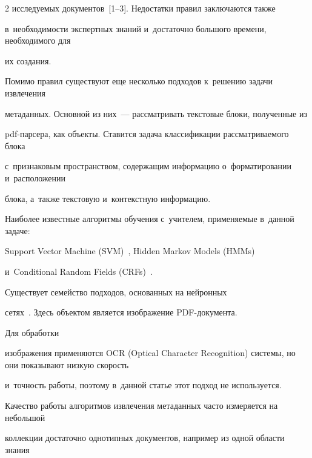 \begin{multicols}{2}
ис\-сле\-ду\-емых документов~[1--3]. Недостатки правил за\-клю\-ча\-ют\-ся также 


в~не\-об\-хо\-ди\-мости экспертных знаний и~до\-ста\-точ\-но большого времени, необходимого для 


их создания.





Помимо правил существуют еще несколько подходов к~решению задачи извлечения 


метаданных. Основной из них~--- рас\-смат\-ри\-вать текстовые блоки, полученные из 


pdf-пар\-се\-ра, как объекты. Ставится задача классификации рас\-смат\-ри\-ва\-емо\-го блока 


с~признаковым про\-стран\-ст\-вом, содержащим информацию о~форматировании и~расположении 


блока, а~так\-же текс\-то\-вую и~кон\-текст\-ную информацию.


{





}





Наиболее известные алгоритмы обуче\-ния с~учителем, при\-ме\-ня\-емые в~данной задаче: 


Support Vector Machine (SVM)~\cite{Han, Kovacevic}, Hidden Markov Models (HMMs)~\cite{Seymore} 


и~Conditional Random Fields (CRFs)~\cite{Councill}.





Существует семейство подходов, основанных на нейронных 


сетях~\cite{Rangoni, Rangoni_1}. Здесь объектом является изображение PDF-до\-ку\-мен\-та. 


Для обработки 


изображения применяются OCR (Optical Character Recognition) сис\-те\-мы, но они показывают низкую скорость 


и~точ\-ность работы, поэтому в~данной \mbox{статье} этот подход не используется.





Качество работы алгоритмов извлечения метаданных час\-то измеряется на небольшой 


коллекции достаточно однотипных документов, например из одной об\-ласти знания 



\end{multicols}

